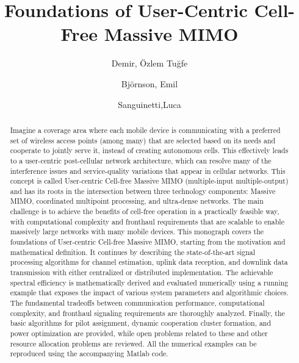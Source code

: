 \documentclass[SIG,biber]{nowfnt}
\title{Foundations of User-Centric Cell-Free Massive MIMO}
\author[1]{Demir, \"{O}zlem Tu\u{g}fe}
\author[2]{Bj\"{o}rnson, Emil}
\author[3]{Sanguinetti,Luca}
\affil[1]{KTH Royal Institute of Technology and Link\"{o}ping University; ozlemtd@kth.se}
\affil[2]{KTH Royal Institute of Technology and Link\"{o}ping University; emilbjo@kth.se}
\affil[3]{University of Pisa; luca.sanguinetti@unipi.it\vspace{-0.5cm}}
\begin{document}
\makeabstracttitle
\begin{abstract}Imagine a coverage area where each mobile device is communicating with a preferred set of wireless access points (among many) that are selected based on its needs and cooperate to jointly serve it, instead of creating autonomous cells. This effectively leads to a user-centric post-cellular network architecture, which can resolve many of the interference issues and service-quality variations that appear in cellular networks. This concept is called User-centric Cell-free Massive MIMO (multiple-input multiple-output) and has its roots in the intersection between three technology components: Massive MIMO, coordinated multipoint processing, and ultra-dense networks. The main challenge is to achieve the benefits of cell-free operation in a practically feasible way, with computational complexity and fronthaul requirements that are scalable to enable massively large networks with many mobile devices. 
This monograph covers the foundations of User-centric Cell-free Massive MIMO, starting from the motivation and mathematical definition. It continues by describing the state-of-the-art signal processing algorithms for channel estimation, uplink data reception, and downlink data transmission with either centralized or distributed implementation.
The achievable spectral efficiency is mathematically derived and evaluated numerically using a running example that exposes the impact of various system parameters and algorithmic choices.
The fundamental tradeoffs between communication performance, computational complexity, and fronthaul signaling requirements are thoroughly analyzed.
Finally, the basic algorithms for pilot assignment, dynamic cooperation cluster formation, and power optimization are provided, while open problems related to these and other resource allocation problems are reviewed. 
All the numerical examples can be reproduced using the accompanying Matlab code.
\end{abstract}














\end{document}
